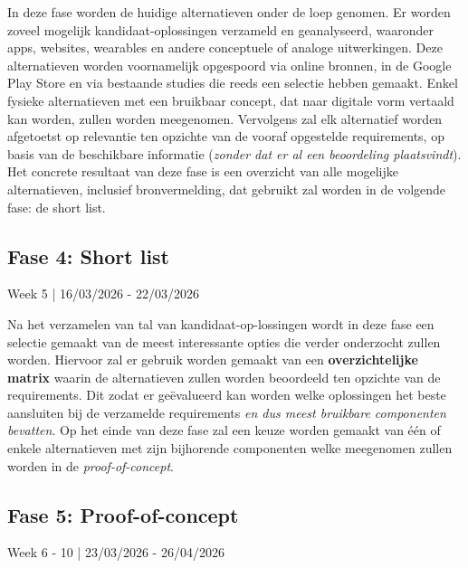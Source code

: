 \vspace{1em}

In deze fase worden de huidige alternatieven onder de loep genomen. Er worden zoveel mogelijk kandidaat-oplossingen verzameld en geanalyseerd, waaronder apps, websites, wearables en andere conceptuele of analoge uitwerkingen. Deze alternatieven worden voornamelijk opgespoord via online bronnen, in de Google Play Store en via bestaande studies die reeds een selectie hebben gemaakt. Enkel fysieke alternatieven met een bruikbaar concept, dat naar digitale vorm vertaald kan worden, zullen worden meegenomen. Vervolgens zal elk alternatief worden afgetoetst op relevantie ten opzichte van de vooraf opgestelde requirements, op basis van de beschikbare informatie (\emph{zonder dat er al een beoordeling plaatsvindt}). Het concrete resultaat van deze fase is een overzicht van alle mogelijke alternatieven, inclusief bronvermelding, dat gebruikt zal worden in de volgende fase: de short list.

\vspace{1em}

\subsection{Fase 4: Short list}%
\label{subsec:Shortlist}
Week 5 \hspace{1em}|\hspace{1em} 16/03/2026 - 22/03/2026

\vspace{1em}

Na het verzamelen van tal van kandidaat-op-lossingen wordt in deze fase een selectie gemaakt van de meest interessante opties die verder onderzocht zullen worden. Hiervoor zal er gebruik worden gemaakt van een \textbf{overzichtelijke matrix} waarin de alternatieven zullen worden beoordeeld ten opzichte van de requirements. Dit zodat er geëvalueerd kan worden welke oplossingen het beste aansluiten bij de verzamelde requirements \emph{en dus meest bruikbare componenten bevatten}. Op het einde van deze fase zal een keuze worden gemaakt van één of enkele alternatieven met zijn bijhorende componenten welke meegenomen zullen worden in de \emph{proof-of-concept}.

\subsection{Fase 5: Proof-of-concept}%
\label{subsec:poc}
Week 6 - 10 \hspace{1em}|\hspace{1em} 23/03/2026 - 26/04/2026

